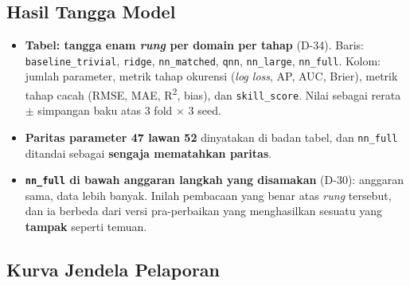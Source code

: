 \subsection{Hasil Tangga Model}

\begin{itemize}
    \item \textbf{Tabel: tangga enam \textit{rung} per domain per tahap}
          (D-34). Baris: \texttt{baseline\_trivial}, \texttt{ridge},
          \texttt{nn\_matched}, \texttt{qnn}, \texttt{nn\_large},
          \texttt{nn\_full}. Kolom: jumlah parameter, metrik tahap okurensi
          (\textit{log loss}, AP, AUC, Brier), metrik tahap cacah (RMSE, MAE,
          R\textsuperscript{2}, bias), dan \texttt{skill\_score}. Nilai sebagai
          rerata $\pm$ simpangan baku atas 3 fold $\times$ 3 seed.
    \item \textbf{Paritas parameter 47 lawan 52} dinyatakan di badan tabel, dan
          \texttt{nn\_full} ditandai sebagai \textbf{sengaja mematahkan paritas}.
    \item \textbf{\texttt{nn\_full} di bawah anggaran langkah yang disamakan}
          (D-30): anggaran sama, data lebih banyak. Inilah pembacaan yang benar
          atas \textit{rung} tersebut, dan ia berbeda dari versi pra-perbaikan
          yang menghasilkan sesuatu yang \textbf{tampak} seperti temuan.
\end{itemize}

\subsection{Kurva Jendela Pelaporan}

